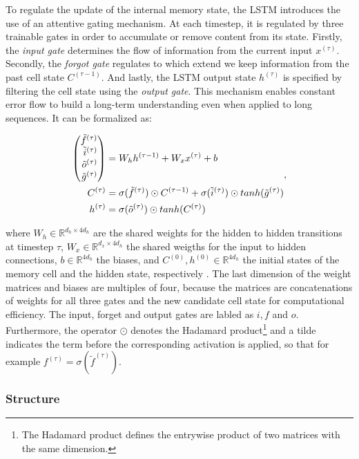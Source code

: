 To regulate the update of the internal memory state, the LSTM introduces the use of an attentive gating mechanism. At each timestep, it is regulated by three trainable gates in order to accumulate or remove content from its state. Firstly, the \textit{input gate} determines the flow of information from the current input $ x^{(\tau)} $. Secondly, the \textit{forgot gate} regulates to which extend we keep information from the past cell state $C^{(\tau-1)}$. And lastly, the LSTM output state $h^{(\tau)}$ is specified by filtering the cell state using the \textit{output gate}. This mechanism enables constant error flow to build a long-term understanding even when applied to long sequences. It can be formalized as:

\begin{equation} \label{eq:lstm}
\begin{aligned}
\Spvek{\tilde{f}^{(\tau)}; \tilde{i}^{(\tau)}; \tilde{o}^{(\tau)}; \tilde{g}^{(\tau)}} &= W_{h} h^{(\tau-1)} + W_{x} x^{(\tau)} + b \\
C^{(\tau)} &= \sigma(\tilde{f}^{(\tau)}) \odot C^{(\tau-1)} + \sigma(\tilde{i}^{(\tau)}) \odot tanh(\tilde{g}^{(\tau)}) \\
h^{(\tau)} &= \sigma(\tilde{o}^{(\tau)}) \odot tanh(C^{(\tau)})
\end{aligned} ,
\end{equation}

where $ W_h \in \mathbb{R}^{d_h \times 4d_h} $ are the shared weights for the hidden to hidden transitions at timestep $ \tau $, $ W_x \in \mathbb{R}^{d_x \times 4d_h} $ the shared weigths for the input to hidden connections, $ b \in \mathbb{R}^{4d_h} $ the biases, and $ C^{(0)}, h^{(0)} \in \mathbb{R}^{4d_h} $ the initial states of the memory cell and the hidden state, respectively \parencite{rnn-batchnorm}. The last dimension of the weight matrices and biases are multiples of four, because the matrices are concatenations of weights for all three gates and the new candidate cell state for computational efficiency. The input, forget and output gates are labled as $ i, f $ and $ o $. Furthermore, the operator $ \odot $ denotes the Hadamard product\footnote{The Hadamard product defines the entrywise product of two matrices with the same dimension.} and a tilde indicates the term before the corresponding activation is applied, so that for example $ f^{(\tau)} = \sigma(\tilde{f}^{(\tau)}) $.


\subsubsection{Structure}

